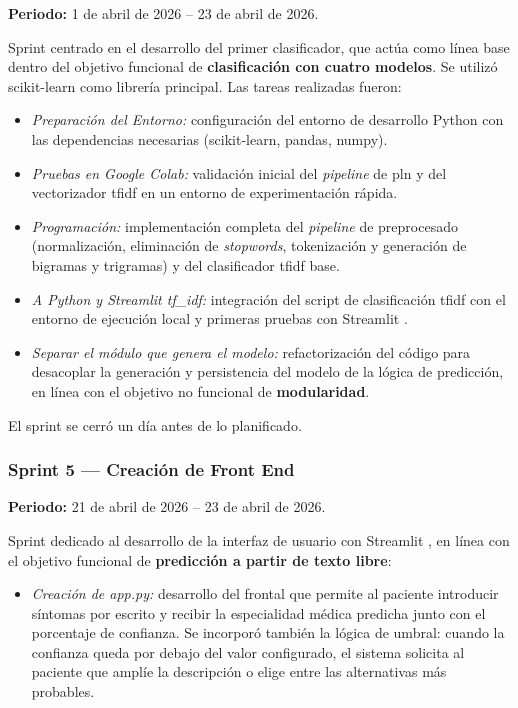 \textbf{Periodo:} 1 de abril de 2026 -- 23 de abril de 2026.

Sprint centrado en el desarrollo del primer clasificador, que actúa como línea base dentro del objetivo funcional de \textbf{clasificación con cuatro modelos}. Se utilizó scikit-learn \cite{scikitlearn_docs} como librería principal. Las tareas realizadas fueron:

\begin{itemize}
	\item \textit{Preparación del Entorno:} configuración del entorno de desarrollo Python con las dependencias necesarias (scikit-learn, pandas, numpy).
	\item \textit{Pruebas en Google Colab:} validación inicial del \textit{pipeline} de \gls{pln} y del vectorizador \gls{tfidf} en un entorno de experimentación rápida.
	\item \textit{Programación:} implementación completa del \textit{pipeline} de preprocesado (normalización, eliminación de \textit{stopwords}, tokenización y generación de bigramas y trigramas) y del clasificador \gls{tfidf} base.
	\item \textit{A Python y Streamlit tf\_idf:} integración del script de clasificación \gls{tfidf} con el entorno de ejecución local y primeras pruebas con Streamlit \cite{streamlit_docs}.
	\item \textit{Separar el módulo que genera el modelo:} refactorización del código para desacoplar la generación y persistencia del modelo de la lógica de predicción, en línea con el objetivo no funcional de \textbf{modularidad}.
\end{itemize}

El sprint se cerró un día antes de lo planificado.

\subsubsection*{Sprint 5 --- Creación de Front End}

\textbf{Periodo:} 21 de abril de 2026 -- 23 de abril de 2026.

Sprint dedicado al desarrollo de la interfaz de usuario con Streamlit \cite{streamlit_docs}, en línea con el objetivo funcional de \textbf{predicción a partir de texto libre}:

\begin{itemize}
	\item \textit{Creación de app.py:} desarrollo del frontal que permite al paciente introducir síntomas por escrito y recibir la especialidad médica predicha junto con el porcentaje de confianza. Se incorporó también la lógica de umbral: cuando la confianza queda por debajo del valor configurado, el sistema solicita al paciente que amplíe la descripción o elige entre las alternativas más probables.
\end{itemize}

